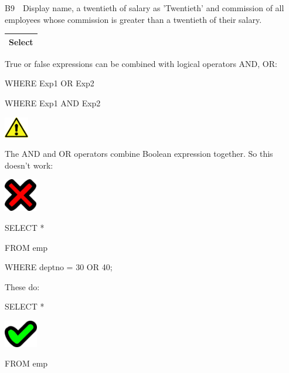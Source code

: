 B9\ \ Display name, a twentieth of salary as 'Twentieth' and commission of all employees whose commission is greater than a twentieth of their salary.

\begin{flushleft}
\tablefirsthead{}
\tablehead{}
\tabletail{}
\tablelasttail{}
\begin{supertabular}{|m{14.303cm}|}
\hline
Select 

\\\hline
\end{supertabular}
\end{flushleft}
True or false expressions can be combined with logical operators AND, OR:

WHERE Exp1 OR Exp2

WHERE Exp1 AND Exp2



\begin{center}
  
\includegraphics[width=1.06cm,height=0.903cm]{images/img (2).png}

\end{center}
The AND and OR operators combine Boolean expression together. So this doesn't work:



\begin{center}
  
\includegraphics[width=1.443cm,height=1.427cm]{images/img (26).png}

\end{center}
SELECT  *

FROM  emp

WHERE deptno = 30 OR 40;

These do:

SELECT  *

\begin{center}
  
\includegraphics[width=1.443cm,height=1.184cm]{images/img (27).png}

\end{center}
FROM  emp

